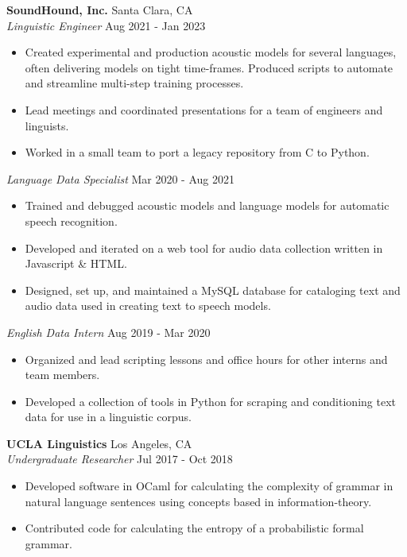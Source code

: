 \documentclass[]{article}
\begin{document}
	
	\textbf{SoundHound, Inc.} \hfill Santa Clara, CA\\
	\textit{Linguistic Engineer} \hfill Aug 2021 - Jan 2023\\
	\vspace{-3mm}
	\begin{itemize} \itemsep 0pt
		\item Created experimental and production acoustic models for several languages, often delivering models on tight time-frames.  Produced scripts to automate and streamline multi-step training processes.
		\item Lead meetings and coordinated presentations for a team of engineers and linguists.
		\item Worked in a small team to port a legacy repository from C to Python. 
	\end{itemize}
	\vspace{-2mm}
	\textit{Language Data Specialist} \hfill Mar 2020 - Aug 2021\\
	\vspace{-3mm}
	\begin{itemize} \itemsep 0pt
		\item Trained and debugged acoustic models and language models for automatic speech recognition.  
		\item Developed and iterated on a web tool for audio data collection written in Javascript \& HTML.
		\item Designed, set up, and maintained a MySQL database for cataloging text and audio data used in creating text to speech models.
	\end{itemize}
	\vspace{-2mm}
	\textit{English Data Intern} \hfill Aug 2019 - Mar 2020\\
	\vspace{-3mm}
	\begin{itemize} \itemsep 0pt
		\item Organized and lead scripting lessons and office hours for other interns and team members.
		\item Developed a collection of tools in Python for scraping and conditioning text data for use in a linguistic corpus.
	\end{itemize}
	
	\textbf{UCLA Linguistics} \hfill Los Angeles, CA\\
	\textit{Undergraduate Researcher} \hfill Jul 2017 - Oct 2018\\
	\vspace{-3mm}
	\begin{itemize} \itemsep 0pt
		\item Developed software in OCaml for calculating the complexity of grammar in natural language sentences using concepts based in information-theory.
		\item Contributed code for calculating the entropy of a probabilistic formal grammar.
	\end{itemize}
	
\end{document}

